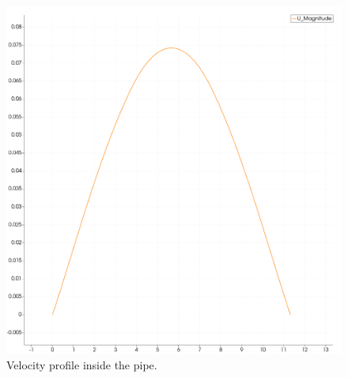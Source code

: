 \documentclass{article}
\begin{document}
\begin{figure}[!tbp]
\begin{minipage}[b]{0.45\textwidth}
      \includegraphics[width=\textwidth]{profile.png}
      \caption{Velocity profile inside the pipe.}
      \label{fig:pipe_profile}
    \end{minipage}
  \end{figure}
\end{document}
